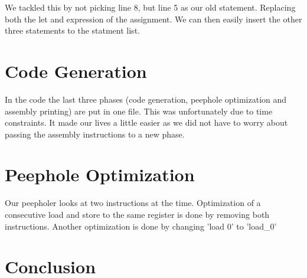 \documentclass[a4paper]{article}
\begin{document}
We tackled this by not picking line 8, but line 5 as our old statement. Replacing
both the let and expression of the assignment. We can then easily insert the
other three statements to the statment list.

\section{Code Generation}
In the code the last three phases (code generation, peephole optimization and
assembly printing) are put in one file. This was unfortunately due to time
constraints. It made our lives a little easier as we did not have to worry
about passing the assembly instructions to a new phase.






\section{Peephole Optimization}
Our peepholer looks at two instructions at the time. Optimization of a consecutive
load and store to the same register is done by removing both instructions.
Another optimization is done by changing 'load 0' to 'load\_0'



\section{Conclusion}



\end{document}
